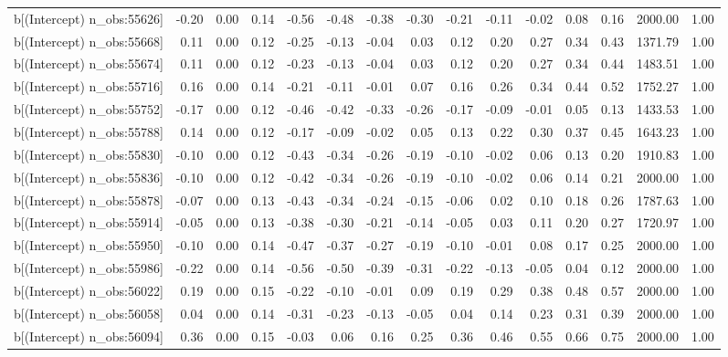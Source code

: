 \begin{table}[ht]
\begin{tabular}{rrrrrrrrrrrrrrr}
  b[(Intercept) n\_obs:55626] & -0.20 & 0.00 & 0.14 & -0.56 & -0.48 & -0.38 & -0.30 & -0.21 & -0.11 & -0.02 & 0.08 & 0.16 & 2000.00 & 1.00 \\ 
  b[(Intercept) n\_obs:55668] & 0.11 & 0.00 & 0.12 & -0.25 & -0.13 & -0.04 & 0.03 & 0.12 & 0.20 & 0.27 & 0.34 & 0.43 & 1371.79 & 1.00 \\ 
  b[(Intercept) n\_obs:55674] & 0.11 & 0.00 & 0.12 & -0.23 & -0.13 & -0.04 & 0.03 & 0.12 & 0.20 & 0.27 & 0.34 & 0.44 & 1483.51 & 1.00 \\ 
  b[(Intercept) n\_obs:55716] & 0.16 & 0.00 & 0.14 & -0.21 & -0.11 & -0.01 & 0.07 & 0.16 & 0.26 & 0.34 & 0.44 & 0.52 & 1752.27 & 1.00 \\ 
  b[(Intercept) n\_obs:55752] & -0.17 & 0.00 & 0.12 & -0.46 & -0.42 & -0.33 & -0.26 & -0.17 & -0.09 & -0.01 & 0.05 & 0.13 & 1433.53 & 1.00 \\ 
  b[(Intercept) n\_obs:55788] & 0.14 & 0.00 & 0.12 & -0.17 & -0.09 & -0.02 & 0.05 & 0.13 & 0.22 & 0.30 & 0.37 & 0.45 & 1643.23 & 1.00 \\ 
  b[(Intercept) n\_obs:55830] & -0.10 & 0.00 & 0.12 & -0.43 & -0.34 & -0.26 & -0.19 & -0.10 & -0.02 & 0.06 & 0.13 & 0.20 & 1910.83 & 1.00 \\ 
  b[(Intercept) n\_obs:55836] & -0.10 & 0.00 & 0.12 & -0.42 & -0.34 & -0.26 & -0.19 & -0.10 & -0.02 & 0.06 & 0.14 & 0.21 & 2000.00 & 1.00 \\ 
  b[(Intercept) n\_obs:55878] & -0.07 & 0.00 & 0.13 & -0.43 & -0.34 & -0.24 & -0.15 & -0.06 & 0.02 & 0.10 & 0.18 & 0.26 & 1787.63 & 1.00 \\ 
  b[(Intercept) n\_obs:55914] & -0.05 & 0.00 & 0.13 & -0.38 & -0.30 & -0.21 & -0.14 & -0.05 & 0.03 & 0.11 & 0.20 & 0.27 & 1720.97 & 1.00 \\ 
  b[(Intercept) n\_obs:55950] & -0.10 & 0.00 & 0.14 & -0.47 & -0.37 & -0.27 & -0.19 & -0.10 & -0.01 & 0.08 & 0.17 & 0.25 & 2000.00 & 1.00 \\ 
  b[(Intercept) n\_obs:55986] & -0.22 & 0.00 & 0.14 & -0.56 & -0.50 & -0.39 & -0.31 & -0.22 & -0.13 & -0.05 & 0.04 & 0.12 & 2000.00 & 1.00 \\ 
  b[(Intercept) n\_obs:56022] & 0.19 & 0.00 & 0.15 & -0.22 & -0.10 & -0.01 & 0.09 & 0.19 & 0.29 & 0.38 & 0.48 & 0.57 & 2000.00 & 1.00 \\ 
  b[(Intercept) n\_obs:56058] & 0.04 & 0.00 & 0.14 & -0.31 & -0.23 & -0.13 & -0.05 & 0.04 & 0.14 & 0.23 & 0.31 & 0.39 & 2000.00 & 1.00 \\ 
  b[(Intercept) n\_obs:56094] & 0.36 & 0.00 & 0.15 & -0.03 & 0.06 & 0.16 & 0.25 & 0.36 & 0.46 & 0.55 & 0.66 & 0.75 & 2000.00 & 1.00 \\ 

\end{tabular}
\end{table}
